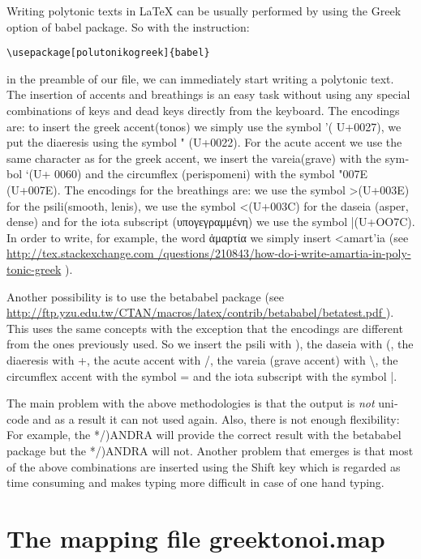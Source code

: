 \documentclass{article}
\let\tb=\textbackslash
\begin{document}
\begin{english}
Writing polytonic texts in   \LaTeX{}  can be usually performed by  using the Greek option  of \textsf{babel} package. So with the instruction: 
\begin{center} \verb'\usepackage[polutonikogreek]{babel}' \end{center} 
in the preamble of our file, we can immediately start writing   a polytonic text. The insertion of   accents and breathings is an easy task without  using any special combinations of keys and dead keys directly  from the keyboard. The encodings are: to insert the greek accent(tonos) we simply use the symbol '( U+0027), we put the diaeresis using the symbol " (U+0022). For the acute accent we use the same character as for the greek accent, we insert the vareia(grave) with the symbol `(U+ 0060) and the circumflex (perispomeni) with the symbol \char"007E  {}(U+007E). 
The encodings for the breathings are:  we use the symbol >(U+003E) for the psili(smooth, lenis),  we use the symbol <(U+003C)  for the daseia (asper, dense) and for the iota subscript (υπογεγραμμένη) we use the symbol |(U+OO7C). In order to write, for example, the word ἁμαρτία we  simply  insert <amart’ia (see \url{http://tex.stackexchange.com /questions/210843/how-do-i-write-amartia-in-polytonic-greek} ).


Another possibility is to  use  the \textsf{betababel} package (see \url{http://ftp.yzu.edu.tw/CTAN/macros/latex/contrib/betababel/betatest.pdf }).
This uses  the same concepts  with the exception that  the encodings are different from the ones previously used. So we insert  the psili with ), the daseia with (, the diaeresis with +, the acute accent with /, the vareia (grave accent) with \tb, the circumflex accent with the symbol = and  the iota subscript with the symbol |. 

The main problem with the  above  methodologies is that the output is \emph{not} unicode and as a result it can not used again. Also, there is not enough flexibility: For example, the */)ANDRA  will provide the correct result with the  \textsf{betababel} package but the */)ANDRA will not. Another problem that  emerges       is that most of the above combinations are inserted using the {\sf Shift}  key which is regarded as time consuming and makes typing more difficult in case of one hand typing.

\section{The mapping file {\sf greektonoi.map} }


\end{english}
\end{document}
